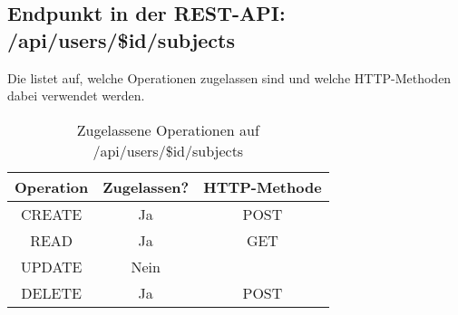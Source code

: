 \subsection{Endpunkt in der REST-API: /api/users/\$id/subjects}
Die  listet auf, welche Operationen zugelassen sind und welche HTTP-Methoden dabei verwendet werden. 

\begin{table}[!htbp]
	\begin{tabular}{|c|c|c|}
		\hline
			\textbf{Operation} & \textbf{Zugelassen?} & \textbf{HTTP-Methode} \\ \hline
			CREATE & Ja & POST \\ \hline 
			READ & Ja & GET \\ \hline
			UPDATE & Nein & \\ \hline 
			DELETE & Ja & POST \\ \hline
	\end{tabular}

		\caption{Zugelassene Operationen auf /api/users/\$id/subjects}
		\label{tab:rest:api:users:id:subjects:meth}
\end{table}

